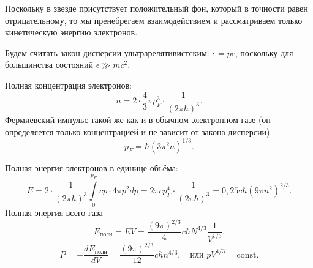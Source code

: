 \documentclass[a4paper]{article}
\begin{document}
\begin{hiProb}[3.28]
\end{hiProb}
\begin{sol}
Поскольку в звезде присутствует положительный фон,
который в точности равен отрицательному, то мы
пренебрегаем взаимодействием и рассматриваем
только кинетическую энергию электронов.

Будем считать закон дисперсии ультрарелятивистским:
$\epsilon =pc$, поскольку для большинства состояний
$\epsilon \gg mc^2$.

Полная концентрация электронов:
\[
	n= 2\cdot  \frac{4}{3} \pi p_F^3\cdot \frac{1}{(2\pi \hbar )^3}
.\] 
Фермиевский импульс такой же как и в обычном электронном газе (он определяется только концентрацией
и не зависит от закона дисперсии):
\[
	p_F= \hbar  (3\pi^2 n)^{1 /3}
.\] 

Полная энергия электронов в единице объёма:
\[
	E=2\cdot \frac{1}{(2\pi \hbar )^3}
	\int\limits_{0}^{p_F} cp \cdot 4\pi
	p^2 dp= 2\pi c p_F^4 \cdot 
	\frac{1}{(2\pi \hbar )^3}=0,25c \hbar 
	(9\pi n^2)^{2 /3}
.\] 
Полная энергия всего газа
\[
	E_{\text{полн}}= E V= \frac{(9\pi)^{2 /3}}{4}
	c \hbar  N^{4 /3} \frac{1}{V^{1 /3}}
.\] 
\[
	P=-\frac{dE_{\text{полн}}}{dV}=\frac{(9\pi)^{2 /3}}{12} c \hbar  n^{4 /3},\quad \text{или }
	pV^{4 /3}=\mathrm{const}
.\] 
\end{sol}
\end{document}
